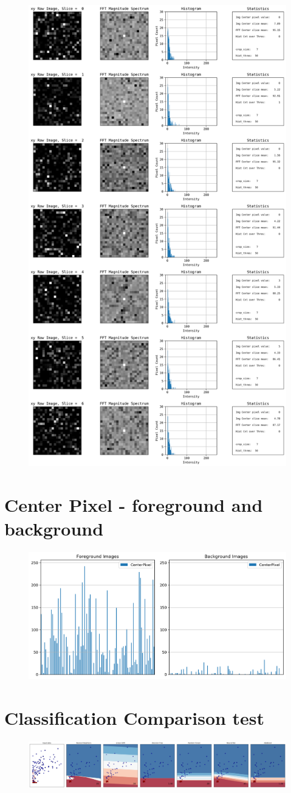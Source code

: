 \documentclass{neu_handout}
\begin{document}
\begin{figure}[!h]
  \includegraphics[width=0.42\linewidth]{background-xy-0}
  \label{fig:visualization}
\end{figure}

\section{Center Pixel - foreground and background}
\begin{figure}[!h]
  \includegraphics[width=0.6\linewidth]{feature-compare-CenterPixel}
  \label{fig:feature-compare-CenterPixel}
\end{figure}

\newpage

\section{Classification Comparison test}
\begin{figure}[!h]
  \includegraphics[width=1\linewidth]{classification-test}
  \label{fig:classification-test}
\end{figure}
\end{document}
